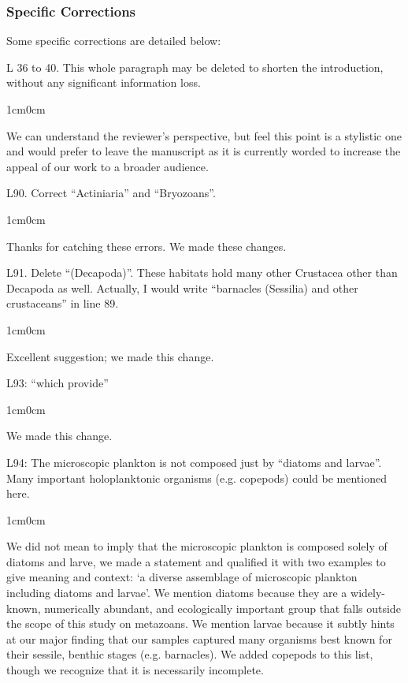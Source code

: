 \documentclass{article}
\newenvironment{response}
	{
	\begin{adjustwidth}{1cm}{0cm}
	\color{peerjBlue}
	}
	{
	\end{adjustwidth}
	}
\begin{document}
\subsubsection*{Specific Corrections}
Some specific corrections are detailed below:

L 36 to 40. This whole paragraph may be deleted to shorten the introduction, without any significant information loss.
\begin{response}
  We can understand the reviewer's perspective, but feel this point is a stylistic one and would prefer to leave the manuscript as it is currently worded to increase the appeal of our work to a broader audience.\\
\end{response}

L90. Correct ``Actiniaria'' and ``Bryozoans''.
\begin{response}
  Thanks for catching these errors. We made these changes.\\
\end{response}

L91. Delete ``(Decapoda)''. These habitats hold many other Crustacea other than Decapoda as well. Actually, I would write ``barnacles (Sessilia) and other crustaceans'' in line 89.
\begin{response}
  Excellent suggestion; we made this change.\\
\end{response}

L93: ``which provide''
\begin{response}
  We made this change.\\
\end{response}

L94: The microscopic plankton is not composed just by ``diatoms and larvae''. Many important holoplanktonic organisms (e.g. copepods) could be mentioned here.
\begin{response}
  We did not mean to imply that the microscopic plankton is composed solely of diatoms and larve, we made a  statement and qualified it with two examples to give meaning and context: `a diverse assemblage of microscopic plankton including diatoms and larvae'.
	We mention diatoms because they are a widely-known, numerically abundant, and ecologically important group that falls outside the scope of this study on metazoans.
	We mention larvae because it subtly hints at our major finding that our samples captured many organisms best known for their sessile, benthic stages (e.g. barnacles).
	We added copepods to this list, though we recognize that it is necessarily incomplete.\\
\end{response}
\end{document}
